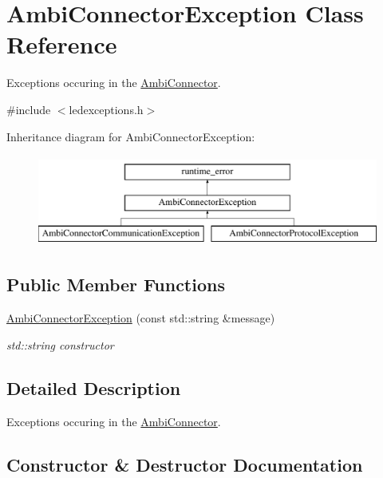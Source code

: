 \hypertarget{classAmbiConnectorException}{}\section{Ambi\+Connector\+Exception Class Reference}
\label{classAmbiConnectorException}


Exceptions occuring in the \hyperlink{classAmbiConnector}{Ambi\+Connector}.  




{\ttfamily \#include $<$ledexceptions.\+h$>$}

Inheritance diagram for Ambi\+Connector\+Exception\+:\begin{figure}[H]
\begin{center}
\leavevmode
\includegraphics[height=3.000000cm]{classAmbiConnectorException}
\end{center}
\end{figure}
\subsection*{Public Member Functions}
\begin{DoxyCompactItemize}
\item 
\hyperlink{classAmbiConnectorException_a3e645fd52f6383ad3420e82d82bb1fbd}{Ambi\+Connector\+Exception} (const std\+::string \&message)
\begin{DoxyCompactList}\small\item\em std\+::string constructor \end{DoxyCompactList}\end{DoxyCompactItemize}


\subsection{Detailed Description}
Exceptions occuring in the \hyperlink{classAmbiConnector}{Ambi\+Connector}. 

\subsection{Constructor \& Destructor Documentation}
